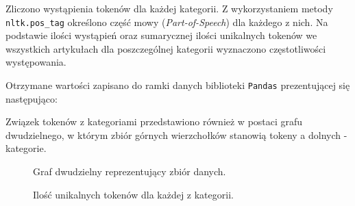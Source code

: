 \documentclass{article}
\begin{document}
Zliczono wystąpienia tokenów dla każdej kategorii. Z wykorzystaniem metody \texttt{nltk.pos\_tag} określono
część mowy (\textit{Part-of-Speech}) dla każdego z nich. Na podstawie ilości wystąpień oraz sumarycznej ilości unikalnych tokenów we wszystkich artykułach dla poszczególnej kategorii wyznaczono częstotliwości występowania.

\newpage
Otrzymane wartości zapisano do ramki danych biblioteki \texttt{Pandas} prezentującej się następująco:



Związek tokenów z kategoriami przedstawiono również w postaci grafu dwudzielnego,
w którym zbiór górnych wierzchołków stanowią tokeny a dolnych - kategorie.

\begin{figure}[H]
    \begin{center}
        \caption{Graf dwudzielny reprezentujący zbiór danych.}
        \label{fig:bipartite_graph}
    \end{center}
\end{figure}



\begin{figure}[H]
    \begin{center}
        \caption{Ilość unikalnych tokenów dla każdej z kategorii.}
        \label{fig:tok_per_cat}
    \end{center}
\end{figure}
\end{document}

